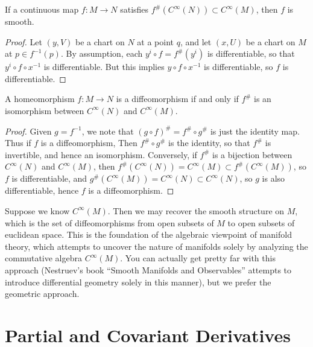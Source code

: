 \begin{lemma}
    If a continuous map $f:M \to N$ satisfies $f^\#(C^\infty(N)) \subset C^\infty(M)$, then $f$ is smooth.
\end{lemma}
\begin{proof}
    Let $(y,V)$ be a chart on $N$ at a point $q$, and let $(x,U)$ be a chart on $M$ at $p \in f^{-1}(p)$. By assumption, each $y^i \circ f = f^\#(y^i)$ is differentiable, so that $y^i \circ f \circ x^{-1}$ is differentiable. But this implies $y \circ f \circ x^{-1}$ is differentiable, so $f$ is differentiable.
\end{proof}

\begin{theorem}
    A homeomorphism $f:M \to N$ is a diffeomorphism if and only if $f^\#$ is an isomorphism between $C^\infty(N)$ and $C^\infty(M)$.
\end{theorem}
\begin{proof}
    Given $g = f^{-1}$, we note that $(g \circ f)^\# = f^\# \circ g^\#$ is just the identity map. Thus if $f$ is a diffeomorphism, Then $f^\# \circ g^\#$ is the identity, so that $f^\#$ is invertible, and hence an isomorphism. Conversely, if $f^\#$ is a bijection between $C^\infty(N)$ and $C^\infty(M)$, then $f^\#(C^\infty(N)) = C^\infty(M) \subset f^\#(C^\infty(M))$, so $f$ is differentiable, and $g^\#(C^\infty(M)) = C^\infty(N) \subset C^\infty(N)$, so $g$ is also differentiable, hence $f$ is a diffeomorphism.
\end{proof}

Suppose we know $C^\infty(M)$. Then we may recover the smooth structure on $M$, which is the set of diffeomorphisms from open subsets of $M$ to open subsets of euclidean space. This is the foundation of the algebraic viewpoint of manifold theory, which attempts to uncover the nature of manifolds solely by analyzing the commutative algebra $C^\infty(M)$. You can actually get pretty far with this approach (Nestruev's book ``Smooth Manifolds and Observables'' attempts to introduce differential geometry solely in this manner), but we prefer the geometric approach.

\section{Partial and Covariant Derivatives}

